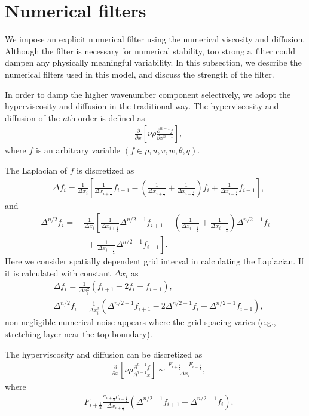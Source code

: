 \section{Numerical filters}
We impose an explicit numerical filter using the numerical viscosity and diffusion.
Although the filter is necessary for numerical stability, too strong a~filter could dampen any physically meaningful variability.
In this subsection, we describe the numerical filters used in this model, and discuss the strength of the filter.


In order to damp the higher wavenumber component selectively, we adopt the hyperviscosity and diffusion in the traditional way.
The hyperviscosity and diffusion of the $n$th order is defined as
\begin{align}
&\frac{\partial }{\partial x}\left[\nu \rho \frac{\partial^{n-1} f}{\partial x^{n-1}}\right], \label{eq:num-diff-def}
\end{align}
where $f$ is an arbitrary variable $(f \in \rho, u, v, w, \theta, q)$.

The Laplacian of $f$ is discretized as
\begin{align}
&\Delta f_i = \frac{1}{\Delta x_i}
\left[
 \frac{1}{\Delta x_{i+\frac{1}{2}}}f_{i+1}
-\left(\frac{1}{\Delta x_{i+\frac{1}{2}}}+\frac{1}{\Delta x_{i-\frac{1}{2}}}\right)f_i
 +\frac{1}{\Delta x_{i-\frac{1}{2}}}f_{i-1}\right],
\end{align}
and
\begin{align}
\Delta^{n/2} f_i =~&\frac{1}{\Delta x_i}
\left[
 \frac{1}{\Delta x_{i+\frac{1}{2}}}\Delta^{n/2-1}f_{i+1}
-\left(\frac{1}{\Delta x_{i+\frac{1}{2}}}+\frac{1}{\Delta x_{i-\frac{1}{2}}}\right)\Delta^{n/2-1}f_i
 \right.\nonumber\\&\left.\,\,+\frac{1}{\Delta x_{i-\frac{1}{2}}}\Delta^{n/2-1}f_{i-1}\right].
   \end{align}
   Here we consider spatially dependent grid interval in calculating
   the Laplacian.  If it is calculated with constant $\Delta x_i$ as
\begin{align}
&\Delta f_i =
  \frac{1}{\Delta x_i^2} \left(f_{i+1} -2f_i +f_{i-1}\right), \\
&  \Delta^{n/2} f_i =
  \frac{1}{\Delta x_i^2} \left(\Delta^{n/2-1}f_{i+1} -2\Delta^{n/2-1}f_i +\Delta^{n/2-1}f_{i-1}\right),
\end{align}
non-negligible numerical noise appears where the grid spacing varies (e.g.,  stretching layer near the top boundary).

The hyperviscosity and diffusion can be discretized as
\begin{align}
&\frac{\partial }{\partial x}\left[\nu \rho \frac{\partial^{n-1} f}{\partial^{n-1} x}\right] \sim
\frac{F_{i+\frac{1}{2}}-F_{i-\frac{1}{2}}}{\Delta x_{i}},
\label{eq:num-diff}
\end{align}
where
\begin{align}
&F_{i+\frac{1}{2}}  \frac{\nu_{i+\frac{1}{2}}\rho_{i+\frac{1}{2}}}{\Delta x_{i+\frac{1}{2}}}
       \left( \Delta^{n/2-1} f_{i+1} - \Delta^{n/2-1} f_i \right).
\label{eq:num-diff-F}
\end{align}

